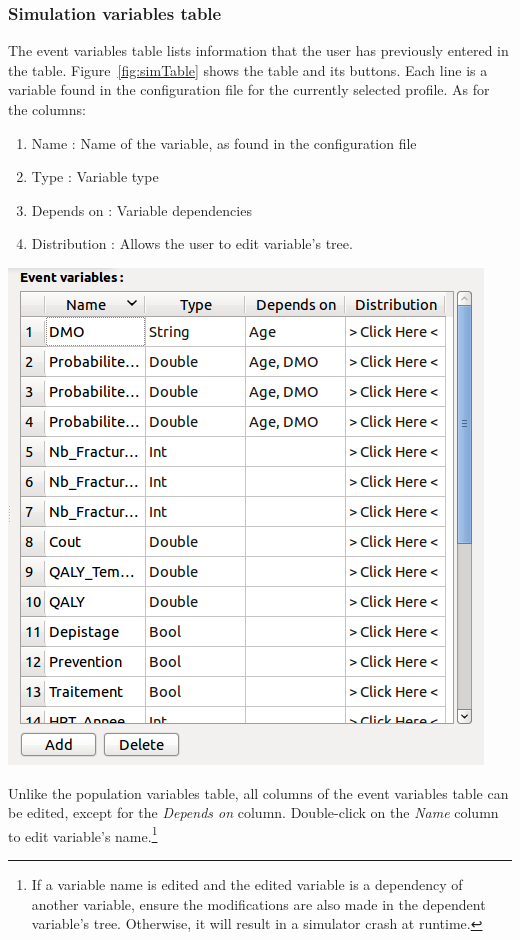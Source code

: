 \documentclass[a4paper,11pt]{report}
\begin{document}
\subsubsection{Simulation variables table}
\label{subsubsec:simVarTab}
The event variables table lists information that the user has previously entered in the table. Figure~\ref{fig:simTable} shows the table and its buttons. Each line is a variable found in the configuration file for the currently selected profile. As for the columns: 
\begin{enumerate}
\item{Name : } Name of the variable, as found in the configuration file
\item{Type : } Variable type
\item{Depends on : } Variable dependencies
\item{Distribution : } Allows the user to edit variable's tree.
\end{enumerate}
\begin{center}
\includegraphics[scale=0.4]{Pictures/Population/SimVarTable.png}
\label{fig:simTable}
\end{center}

Unlike the population variables table, all columns of the event variables table can be edited, except for the \emph{Depends on} column. Double-click on the \emph{Name} column to edit variable's name.\footnote{If a variable name is edited and the edited variable is a dependency of another variable, ensure the modifications are also made in the dependent variable's tree. Otherwise, it will result in a simulator crash at runtime.}
\end{document}
